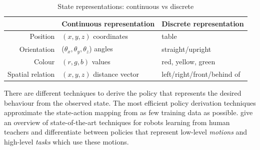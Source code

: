 \begin{table}[ht]
	\centering
	\caption{State representations: continuous vs discrete}
	\label{tab:representations}
	\begin{tabular}{r|ll}
		& Continuous representation & Discrete representation\\ \hline
		Position & $(x,y,z)$ coordinates & table \\
		Orientation & ($\theta_x,\theta_y,\theta_z$) angles & straight/upright \\
		Colour & $(r,g,b)$ values & red, yellow, green\\
		Spatial relation & $(x,y,z)$ distance vector & left/right/front/behind of 
	\end{tabular}
\end{table}

There are different techniques to derive the policy that represents the desired behaviour from the observed state.
The most efficient policy derivation techniques approximate the state-action mapping from as few training data as possible.
\cite{chernova2014robot} give an overview of state-of-the-art techniques for robots learning from human teachers and differentiate between policies that represent low-level \textit{motions} and high-level \textit{tasks} which use these motions. 

